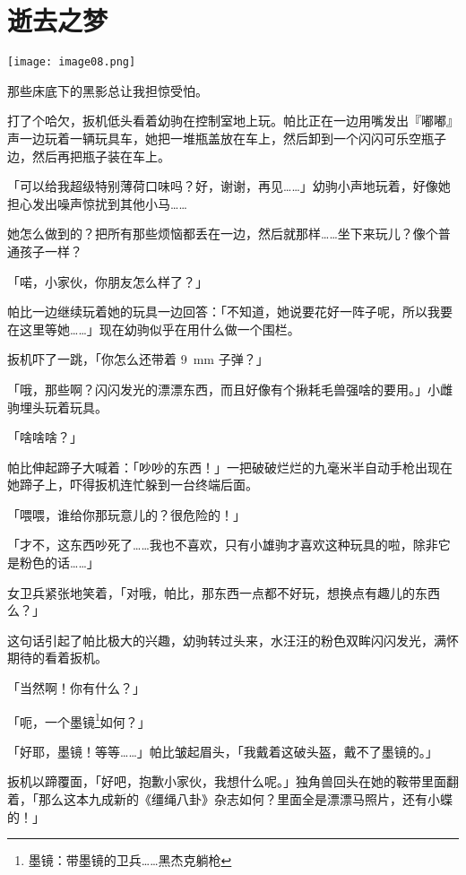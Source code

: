 \chapter{逝去之梦}

\texttt{[image: image08.png]}

\begin{intro}
那些床底下的黑影总让我担惊受怕。
\end{intro}


打了个哈欠，扳机低头看着幼驹在控制室地上玩。帕比正在一边用嘴发出『嘟嘟』声一边玩着一辆玩具车，她把一堆瓶盖放在车上，然后卸到一个闪闪可乐空瓶子边，然后再把瓶子装在车上。

「可以给我超级特别薄荷口味吗？好，谢谢，再见……」幼驹小声地玩着，好像她担心发出噪声惊扰到其他小马……

她怎么做到的？把所有那些烦恼都丢在一边，然后就那样……坐下来玩儿？像个普通孩子一样？

「喏，小家伙，你朋友怎么样了？」

帕比一边继续玩着她的玩具一边回答：「不知道，她说要花好一阵子呢，所以我要在这里等她……」现在幼驹似乎在用什么做一个围栏。

扳机吓了一跳，「你怎么还带着 \SI{9}{mm} 子弹？」

「哦，那些啊？闪闪发光的漂漂东西，而且好像有个揪耗毛兽强啥的要用。」小雌驹埋头玩着玩具。

「啥啥啥？」

帕比伸起蹄子大喊着：「吵吵的东西！」一把破破烂烂的九毫米半自动手枪出现在她蹄子上，吓得扳机连忙躲到一台终端后面。

「喂喂，谁给你那玩意儿的？很危险的！」

「才不，这东西吵死了……我也不喜欢，只有小雄驹才喜欢这种玩具的啦，除非它是粉色的话……」

女卫兵紧张地笑着，「对哦，帕比，那东西一点都不好玩，想换点有趣儿的东西么？」

这句话引起了帕比极大的兴趣，幼驹转过头来，水汪汪的粉色双眸闪闪发光，满怀期待的看着扳机。

「当然啊！你有什么？」

「呃，一个墨镜\footnote{墨镜：带墨镜的卫兵……黑杰克躺枪}如何？」

「好耶，墨镜！等等……」帕比皱起眉头，「我戴着这破头盔，戴不了墨镜的。」

扳机以蹄覆面，「好吧，抱歉小家伙，我想什么呢。」独角兽回头在她的鞍带里面翻着，「那么这本九成新的《缰绳八卦》杂志如何？里面全是漂漂马照片，还有小蝶的！」

